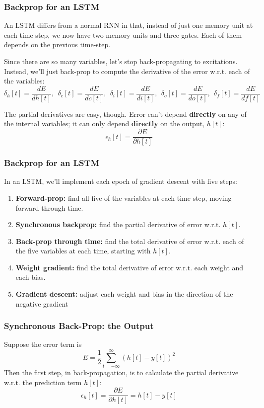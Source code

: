 \documentclass{beamer}
\begin{document}
\begin{frame}
  \frametitle{Backprop for an LSTM}

  An LSTM differs from a normal RNN in that, instead of just one
  memory unit at each time step, we now have two memory units and
  three gates.  Each of them depends on the previous time-step.

  Since there are so many variables, let's stop back-propagating to
  excitations.  Instead, we'll just back-prop to compute the
  derivative of the error w.r.t. each of the variables:
  \[\delta_h[t]=\frac{dE}{dh[t]},~~\delta_c[t]=\frac{dE}{dc[t]},~~
  \delta_i[t]=\frac{dE}{di[t]},~~\delta_o[t]=\frac{dE}{do[t]},~~\delta_f[t]=\frac{dE}{df[t]}\]

  The partial derivatives are easy, though.  Error can't depend {\bf
    directly} on any of the internal variables; it can only depend
  {\bf directly} on the output, $h[t]$:
  \[\epsilon_h[t]=\frac{\partial E}{\partial h[t]}\]
\end{frame}
  
\begin{frame}
  \frametitle{Backprop for an LSTM}
  In an LSTM, we'll implement each epoch of gradient descent with five steps:
  \begin{enumerate}
    \item {\bf Forward-prop:} find all five of the variables at each time step,
      moving forward through time.
    \item {\bf Synchronous backprop:} find the partial derivative of
      error w.r.t. $h[t]$.  
    \item {\bf Back-prop through time:} find the total derivative of
      error w.r.t. each of the five variables at each time, starting with $h[t]$.
    \item {\bf Weight gradient:} find the total derivative of error
      w.r.t. each weight and each bias.
    \item {\bf Gradient descent:} adjust each weight and bias in the direction
      of the negative gradient
  \end{enumerate}
\end{frame}

  
\begin{frame}
  \frametitle{Synchronous Back-Prop: the Output}
  Suppose the error term is
  \[
  E = \frac{1}{2}\sum_{t=-\infty}^\infty \left(h[t]-y[t]\right)^2
  \]
  Then the first step, in back-propagation, is to calculate the
  partial derivative w.r.t. the prediction term $h[t]$:
  \[
  \epsilon_h[t] = \frac{\partial E}{\partial h[t]} = h[t]-y[t]
  \]
\end{frame}
\end{document}
